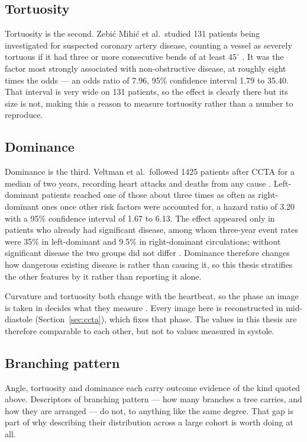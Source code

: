 \subsection{Tortuosity}

Tortuosity is the second.
Zebi\'c Mihi\'c et al.\ studied 131 patients being investigated for suspected coronary artery
disease, counting a vessel as severely tortuous if it had three or more consecutive bends of at
least $45^\circ$ \cite{zebicmihic2023tortuosity}.
It was the factor most strongly associated with non-obstructive disease, at roughly eight times
the odds --- an odds ratio of 7.96, 95\% confidence interval 1.79 to 35.40.
That interval is very wide on 131 patients, so the effect is clearly there but its size is not,
making this a reason to measure tortuosity rather than a number to reproduce.

\subsection{Dominance}

Dominance is the third.
Veltman et al.\ followed 1425 patients after CCTA for a median of two years, recording heart
attacks and deaths from any cause \cite{veltman2012dominance}.
Left-dominant patients reached one of those about three times as often as right-dominant ones once
other risk factors were accounted for, a hazard ratio of 3.20 with a 95\% confidence interval of
1.67 to 6.13.
The effect appeared only in patients who already had significant disease, among whom three-year
event rates were 35\% in left-dominant and 9.5\% in right-dominant circulations; without
significant disease the two groups did not differ \cite{veltman2012dominance}.
Dominance therefore changes how dangerous existing disease is rather than causing it, so this
thesis stratifies the other features by it rather than reporting it alone.

Curvature and tortuosity both change with the heartbeat, so the phase an image is taken in decides
what they measure \cite{rampidis2022geometry}.
Every image here is reconstructed in mid-diastole (Section~\ref{sec:ccta}), which fixes that phase.
The values in this thesis are therefore comparable to each other, but not to values measured in
systole.

\subsection{Branching pattern}

Angle, tortuosity and dominance each carry outcome evidence of the kind quoted above.
Descriptors of branching pattern --- how many branches a tree carries, and how they are arranged
--- do not, to anything like the same degree.
That gap is part of why describing their distribution across a large cohort is worth doing at all.
